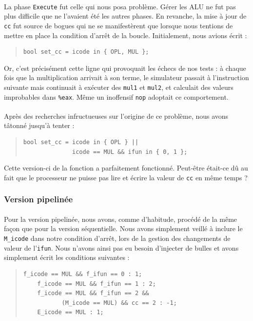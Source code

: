 \documentclass[12pt]{article}
\begin{document}
\paragraph{}La phase \verb+Execute+ fut celle qui nous posa problème. Gérer les ALU ne fut pas plus difficile que ne l'avaient été les autres phases. En revanche, la mise à jour de \verb+cc+ fut source de bogues qui ne se manifestèrent que lorsque nous tentions de mettre en place la condition d'arrêt de la boucle. Initialement, nous avions écrit :
\begin{quote}
\begin{verbatim}
bool set_cc = icode in { OPL, MUL };
\end{verbatim}
\end{quote}
Or, c'est précisément cette ligne qui provoquait les échecs de nos tests : à chaque fois que la multiplication arrivait à son terme, le simulateur passait à l'instruction suivante mais continuait à exécuter des \verb+mul1+ et \verb+mul2+, et calculait des valeurs improbables dans \verb+%eax+. Même un inoffensif \verb+nop+ adoptait ce comportement.

\paragraph{}Après des recherches infructueuses sur l'origine de ce problème, nous avons tâtonné jusqu'à tenter :
\begin{quote}
\begin{verbatim}
bool set_cc = icode in { OPL } ||
              icode == MUL && ifun in { 0, 1 };
\end{verbatim}
\end{quote}
Cette version-ci de la fonction a parfaitement fonctionné. Peut-être était-ce dû au fait que le processeur ne puisse pas lire et écrire la valeur de \verb+cc+ en même temps ?

\subsubsection{Version pipelinée}
\paragraph{}Pour la version pipelinée, nous avons, comme d'habitude, procédé de la même façon que pour la version séquentielle. Nous avons simplement veillé à inclure le \verb+M_icode+ dans notre condition d'arrêt, lors de la gestion des changements de valeur de l'\verb+ifun+. Nous n'avons ainsi pas eu besoin d'injecter de bulles et avons simplement écrit les conditions suivantes :
\begin{quote}
  \begin{verbatim}
f_icode == MUL && f_ifun == 0 : 1;
	f_icode == MUL && f_ifun == 1 : 2;
	f_icode == MUL && f_ifun == 2 &&
           (M_icode == MUL) && cc == 2 : -1;
	E_icode == MUL : 1;
\end{verbatim}
\end{quote}
\end{document}
